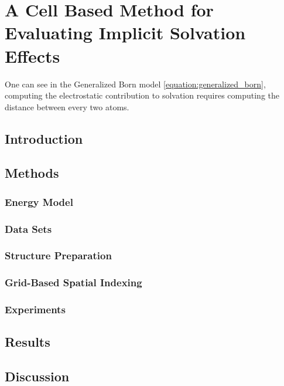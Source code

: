 \chapter[Cell Based Implicit Solvent Model]{A Cell Based Method for Evaluating Implicit Solvation Effects}
\label{chapter:cell_solvent}

One can see in the Generalized Born model \eqref{equation:generalized_born}, computing the electrostatic contribution to solvation requires computing the distance between every two atoms.

\section{Introduction}
\label{section:cell/intro}



\section{Methods}
\label{section:cell/methods}
    \subsection{Energy Model}
    \label{subsection:energy_model}
    

    \subsection{Data Sets}
    \label{subsection:data_sets}
    

    \subsection{Structure Preparation}
    \label{subsection:structure_preparation}
    

    \subsection{Grid-Based Spatial Indexing}
    \label{subsection:grid_based_indexing}
    

    \subsection{Experiments}
    \label{subsection:experiments}
    


\section{Results}
\label{section:cell/results}



\section{Discussion}
\label{section:cell/discussion}


